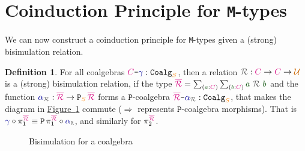 \documentclass[twoside,11pt,openright]{report}
\theoremstyle{plain} %
\theoremstyle{definition}
\newtheorem{defn}[thm]{Definition}%
\theoremstyle{remark}
\newcommand*{\figref}[1]{\hyperref[fig:#1]{Figure~\ref*{fig:#1}}}
\newcommand*{\term}[1]{\textcolor{green!30!black}{#1}} %
\newcommand*{\type}[1]{\textcolor{magenta!90!black}{#1}}
\newcommand*{\container}[1]{\textcolor{orange}{#1}}
\newcommand*{\universe}[1]{\textcolor{orange!80!black}{#1}}
\newcommand*{\coalg}[2]{#1\texttt{-}#2}
\newcommand*{\relation}[1]{\textcolor{gray!75!black}{\ensuremath{\mathtt{#1}}}}
\newcommand*{\function}[1]{\textcolor{blue!60!black}{\ensuremath{\mathtt{#1}}}}
\newcommand*{\typeformer}[1]{\ensuremath{\mathtt{#1}}}
\newcommand*{\functor}[1]{\ensuremath{\mathbf{\mathtt{#1}}}}
\begin{document}
\section{Coinduction Principle for \texttt{M}-types}
We can now construct a coinduction principle for \texttt{M}-types given a (strong) bisimulation relation.
\begin{defn}
  For all coalgebras \(\coalg{\type{C}}{\function{\gamma}} : \typeformer{Coalg}_{\container{S}}\), then a relation \(\relation{\mathcal{R}} : \type{C} \rightarrow \type{C} \rightarrow \universe{\mathcal{U}}\) is a (strong) bisimulation relation, if the type \(\type{\overline{\mathcal{R}}} = \sum_{(\term{a} : \type{C})} \sum_{(\term{b} : \type{C})} \term{a}~\relation{\mathcal{R}}~\term{b}\) and the function \(\function{\alpha}_{\relation{\mathcal{R}}} : \type{\overline{\mathcal{R}}} \rightarrow \functor{P}_{\container{S}}\,\type{\overline{\mathcal{R}}}\) forms a \(\functor{P}\)-coalgebra \(\coalg{\type{\overline{\mathcal{R}}}}{\function{\alpha}_{\relation{\mathcal{R}}}} : \mathtt{Coalg}_{\container{S}}\), that makes the diagram in \figref{coalgebra-coinduction-definition} commute (\(\Longrightarrow\) represents \(\functor{P}\)-coalgebra morphisms). That is \(\function{\gamma} \circ \pi_1^{\type{\overline{\mathcal{R}}}} \equiv \functor{P}\,\pi_1^{\type{\overline{\mathcal{R}}}} \circ \function{\alpha}_{\relation{R}}\), and similarly for \(\pi_2^{\type{\overline{\mathcal{R}}}}\).
  \begin{figure}[h]
    \centering
    \caption{Bisimulation for a coalgebra}
    \label{fig:coalgebra-coinduction-definition}
  \end{figure}
\end{defn}
\end{document}
